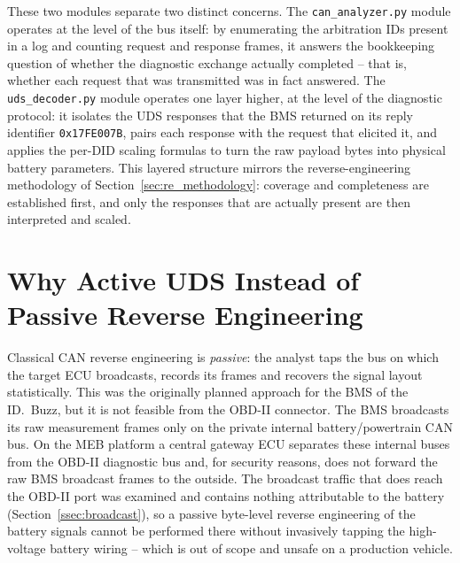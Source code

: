 \documentclass[11pt,a4paper,oneside,parskip=half]{scrreprt}
\providecommand{\hex}{}\renewcommand{\hex}[1]{\texttt{0x#1}}
\begin{document}
These two modules separate two distinct concerns. The \texttt{can\_analyzer.py} module operates at the level of the bus itself: by enumerating the arbitration IDs present in a log and counting request and response frames, it answers the bookkeeping question of whether the diagnostic exchange actually completed -- that is, whether each request that was transmitted was in fact answered. The \texttt{uds\_decoder.py} module operates one layer higher, at the level of the diagnostic protocol: it isolates the UDS responses that the BMS returned on its reply identifier \hex{17FE007B}, pairs each response with the request that elicited it, and applies the per-DID scaling formulas to turn the raw payload bytes into physical battery parameters. This layered structure mirrors the reverse-engineering methodology of Section~\ref{sec:re_methodology}: coverage and completeness are established first, and only the responses that are actually present are then interpreted and scaled.

\section{Why Active UDS Instead of Passive Reverse Engineering}
\label{sec:why_uds}
Classical CAN reverse engineering is \textit{passive}: the analyst taps the bus on which the target ECU broadcasts, records its frames and recovers the signal layout statistically. This was the originally planned approach for the BMS of the ID.~Buzz, but it is not feasible from the OBD-II connector. The BMS broadcasts its raw measurement frames only on the private internal battery/powertrain CAN bus. On the MEB platform a central gateway ECU separates these internal buses from the OBD-II diagnostic bus and, for security reasons, does not forward the raw BMS broadcast frames to the outside. The broadcast traffic that does reach the OBD-II port was examined and contains nothing attributable to the battery (Section~\ref{ssec:broadcast}), so a passive byte-level reverse engineering of the battery signals cannot be performed there without invasively tapping the high-voltage battery wiring -- which is out of scope and unsafe on a production vehicle.
\end{document}
